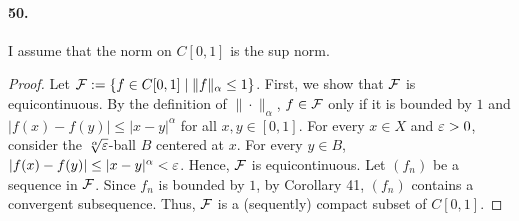 \paragraph{50.} I assume that the norm on $C[0, 1]$ is the sup norm. 
\begin{proof}
  Let $\mathcal{F} := \{f\in C[0, 1]\mid \|f\|_\alpha \le 1 \}$. First, we show
  that $\mathcal{F}$ is equicontinuous. By the definition of $\|\cdot\|_\alpha$,
  $f\in\mathcal{F}$ only if it is bounded by $1$ and $|f(x) - f(y)| \le 
  |x - y|^\alpha$ for all $x, y \in [0, 1]$. For every $x\in X$ and $\varepsilon > 0$,
  consider the $\sqrt[\alpha]{\varepsilon}$-ball $B$ centered at $x$. For every
  $y \in B$, $|f(x) - f(y)| \le |x - y|^\alpha < \varepsilon$. Hence, $\mathcal{F}$ is
  equicontinuous. Let $(f_n)$ be a sequence in $\mathcal{F}$. Since $f_n$ is
  bounded by $1$, by Corollary 41, $(f_n)$ contains a convergent subsequence. 
  Thus, $\mathcal{F}$ is a (sequently) compact subset of $C[0, 1]$.
\end{proof}








